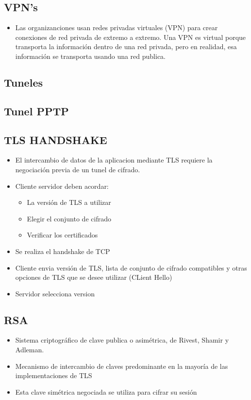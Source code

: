 \documentclass[11pt]{article}
\begin{document}
\subsection{VPN's}
\label{sec:orgebda1bc}
\begin{itemize}
\item Las organizanciones usan redes privadas virtuales (VPN) para crear conexiones de red privada de extremo a extremo. Una VPN es virtual porque transporta la información dentro de una red privada, pero en realidad, esa información se transporta usando una red publica.
\end{itemize}
\subsection{Tuneles}
\label{sec:orgf69dc39}

\subsection{Tunel PPTP}
\label{sec:orgb6916d4}


\subsection{TLS HANDSHAKE}
\label{sec:orgf5cb008}
\begin{itemize}
\item El intercambio de datos de la aplicacion mediante TLS requiere la negociación previa de un tunel de cifrado.
\item Cliente servidor deben acordar:
\begin{itemize}
\item La versión de TLS a utilizar
\item Elegir el conjunto de cifrado
\item Verificar los certificados
\end{itemize}

\item Se realiza el handshake de TCP
\item Cliente envia versión de TLS, lista de conjunto de cifrado compatibles y otras opciones de TLS que se desee utilizar (CLient Hello)
\item Servidor selecciona version
\end{itemize}
\subsection{RSA}
\label{sec:orgb3062db}
\begin{itemize}
\item Sistema criptográfico de clave publica o asimétrica, de Rivest, Shamir y Adleman.
\item Mecanismo de intercambio de claves predominante en la mayoría de las implementaciones de TLS
\item Esta clave simétrica negociada se utiliza para cifrar su sesión
\end{itemize}
\end{document}
